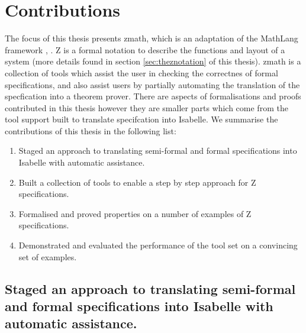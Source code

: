 %
%

\section{Contributions}

The focus of this thesis presents \gls{zmath}, which is an adaptation of the MathLang framework \cite{newmathlang}, \cite{wtt}. Z is a formal notation to describe the functions and layout of a system (more details found in section \ref{sec:theznotation} of this thesis). \Gls{zmath} is a collection of tools which assist the user in checking the correctnes of formal specifications, and also assist users by partially automating the translation of the specfication into a theorem prover. There are aspects of formalisations and proofs contributed in this thesis however they are smaller parts which come from the tool support built to translate specifcation into Isabelle. We summarise the contributions of this thesis in the following list:

\begin{enumerate}
\item Staged an approach to translating semi-formal and formal specifications into Isabelle with automatic assistance.
\item Built a collection of tools to enable a step by step approach for Z specifications.
\item Formalised and proved properties on a number of examples of Z specifications.
\item Demonstrated and evaluated the performance of the tool set on a convincing set of examples.
\end{enumerate}

\subsection{Staged an approach to translating semi-formal and formal specifications into Isabelle with automatic assistance.}

